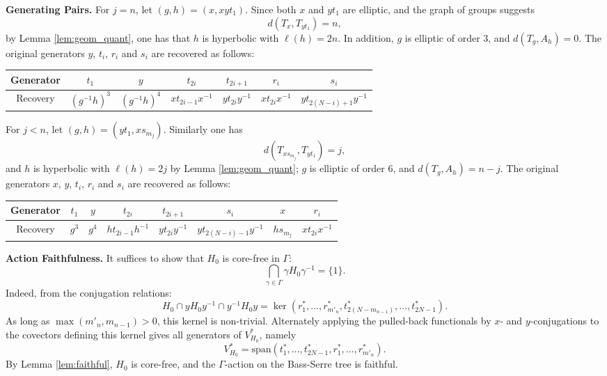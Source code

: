 \documentclass[12pt,leqno]{amsart}
\makeatletter
\renewenvironment{proof}[1][\proofname]{%
	\par
	\pushQED{\qed}%
	\normalfont
	\topsep6\p@\@plus6\p@\relax
	\trivlist
	\item[\hskip\labelsep\itshape #1\@addpunct{.}]%
	\ignorespaces
}{%
	\par\nobreak\vspace{2pt}%
	\popQED%
	\medskip%
	\endtrivlist
	\@endpefalse
}
\newcommand{\2}{L^2_{\rm per}(0, T)}
\numberwithin{equation}{section}
\numberwithin{figure}{section}
\makeatother
\begin{document}
\begin{proof}
    \textbf{Generating Pairs.} For $j=n$, let $(g,h) = (x,xyt_1)$. Since both $x$ and $yt_1$ are elliptic, and the graph of groups suggests
    \[
    d(T_x,T_{yt_1}) = n,
    \]
    by Lemma \ref{lem:geom_quant}, one has that $h$ is hyperbolic with $\ell(h) = 2n$. In addition, $g$ is elliptic of order $3$, and $d(T_g,A_h) = 0$. The original generators $y$, $t_i$, $r_i$ and $s_i$ are recovered as follows:
    \begin{center}
        \begin{tabular}{c||c|c|c|c|c|c}
            Generator & $t_1$ & $y$ & $t_{2i}$ & $t_{2i+1}$ & $r_i$ & $s_i$ \\
            \hline
            Recovery & $(g^{-1}h)^3$ & $(g^{-1}h)^4$ & $xt_{2i-1}x^{-1}$ & $yt_{2i}y^{-1}$ & $xt_{2i}x^{-1}$ & $yt_{2(N-i)+1}y^{-1}$
        \end{tabular}
    \end{center}

    For $j<n$, let $(g,h) = (yt_1,xs_{m_j})$. Similarly one has
    \[
    d(T_{xs_{m_j}},T_{yt_1}) = j,
    \]
    and $h$ is hyperbolic with $\ell(h) = 2j$ by Lemma \ref{lem:geom_quant}; $g$ is elliptic of order $6$, and $d(T_g,A_h) = n-j$. The original generators $x$, $y$, $t_i$, $r_i$ and $s_i$ are recovered as follows:
    \begin{center}
        \begin{tabular}{c||c|c|c|c|c|c|c}
            Generator & $t_1$ & $y$ & $t_{2i}$ & $t_{2i+1}$ & $s_i$ & $x$ & $r_i$ \\
            \hline
            Recovery & $g^3$ & $g^4$ & $ht_{2i-1}h^{-1}$ & $yt_{2i}y^{-1}$ & $yt_{2(N-i)-1}y^{-1}$ & $hs_{m_j}$ & $xt_{2i}x^{-1}$
        \end{tabular}
    \end{center}

    \textbf{Action Faithfulness.} It suffices to show that $H_0$ is core-free in $\Gamma$:
    \[
    \bigcap_{\gamma\in\Gamma}\gamma H_0\gamma^{-1} = \{1\}.
    \]
    Indeed, from the conjugation relations:
    \[
    H_0\cap yH_0y^{-1}\cap y^{-1}H_0y = \ker(r_1^*,\dots,r_{m'_{n}}^*,t_{2(N-m_{n-1})}^*,\dots,t_{2N-1}^*).
    \]
    As long as $\max(m'_n,m_{n-1})>0$, this kernel is non-trivial. Alternately applying the pulled-back functionals by $x$- and $y$-conjugations to the covectors defining this kernel gives all generators of $V_{H_0}^*$, namely
    \[
    V_{H_0}^* = \mathrm{span}(t_1^*,\dots,t_{2N-1}^*,r_1^*,\dots,r_{m'_{n}}^*).
    \]
    By Lemma \ref{lem:faithful}, $H_0$ is core-free, and the $\Gamma$-action on the Bass-Serre tree is faithful.
\end{proof}
\end{document}
